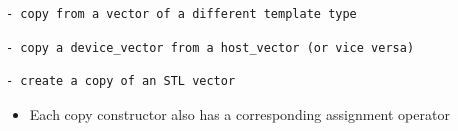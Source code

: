 \begin{Shaded}
\begin{Highlighting}[]

\end{Highlighting}
\end{Shaded}

\begin{verbatim}
- copy from a vector of a different template type
\end{verbatim}

\begin{Shaded}
\begin{Highlighting}[]

\NormalTok{);}
\end{Highlighting}
\end{Shaded}

\begin{verbatim}
- copy a device_vector from a host_vector (or vice versa)
\end{verbatim}

\begin{Shaded}
\begin{Highlighting}[]

\end{Highlighting}
\end{Shaded}

\begin{verbatim}
- create a copy of an STL vector
\end{verbatim}

\begin{Shaded}
\begin{Highlighting}[]

\end{Highlighting}
\end{Shaded}

\begin{itemize}
\itemsep1pt\parskip0pt
\item
  Each copy constructor also has a corresponding assignment operator
\end{itemize}


